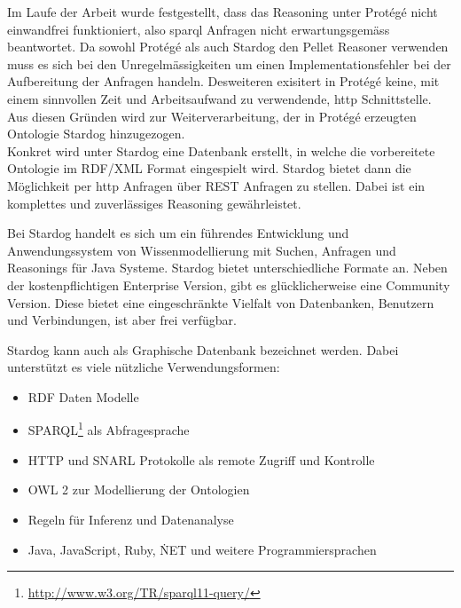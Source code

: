 Im Laufe der Arbeit wurde festgestellt, dass das Reasoning unter Protégé nicht einwandfrei funktioniert, also sparql Anfragen nicht erwartungsgemäss beantwortet. Da sowohl Protégé als auch Stardog den Pellet Reasoner verwenden muss es sich bei den Unregelmässigkeiten um einen Implementationsfehler bei der Aufbereitung der Anfragen handeln. Desweiteren exisitert in Protégé keine, mit einem sinnvollen Zeit und Arbeitsaufwand zu verwendende, http Schnittstelle. Aus diesen Gründen wird zur Weiterverarbeitung, der in Protégé erzeugten Ontologie Stardog hinzugezogen.\\
Konkret wird unter Stardog eine Datenbank erstellt, in welche die vorbereitete Ontologie im RDF/XML Format eingespielt wird. Stardog bietet dann die Möglichkeit per http Anfragen über REST Anfragen zu stellen. Dabei ist ein komplettes und zuverlässiges Reasoning gewährleistet.

Bei Stardog handelt es sich um ein führendes Entwicklung und Anwendungssystem von Wissenmodellierung mit Suchen, Anfragen und Reasonings für Java Systeme. Stardog bietet unterschiedliche Formate an. Neben der kostenpflichtigen Enterprise Version, gibt es glücklicherweise eine Community Version. Diese bietet eine eingeschränkte Vielfalt von Datenbanken, Benutzern und Verbindungen, ist aber frei verfügbar.\cite{stardog}

Stardog kann auch als Graphische Datenbank bezeichnet werden. Dabei unterstützt es viele nützliche Verwendungsformen:
\begin{itemize}
	\item RDF Daten Modelle
	\item SPARQL\footnote{\url{http://www.w3.org/TR/sparql11-query/}} als Abfragesprache
	\item HTTP und SNARL Protokolle als remote Zugriff und Kontrolle
	\item OWL 2 zur Modellierung der Ontologien
	\item Regeln für Inferenz und Datenanalyse
	\item Java, JavaScript, Ruby, \.NET und weitere Programmiersprachen
\end{itemize}
\cite{stardogDocu}


